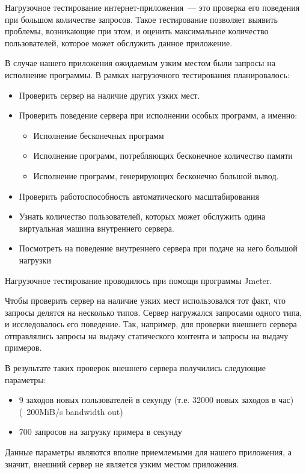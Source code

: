	Нагрузочное тестирование интернет-приложения~--- это проверка его поведения при большом количестве запросов. Такое тестирование позволяет выявить проблемы, возникающие при этом, и оценить максимальное количество пользователей, которое может обслужить данное приложение.
	
	В случае нашего приложения ожидаемым узким местом были запросы на исполнение программы. В рамках нагрузочного тестирования планировалось: 
\begin{itemize}
\item Проверить сервер на наличие других узких мест.
\item Проверить поведение сервера при исполнении особых программ, а именно:
	\begin{itemize}
		\item Исполнение бесконечных программ
		\item Исполнение программ, потребляющих бесконечное количество памяти
		\item Исполнение программ, генерирующих бесконечно большой вывод.
	\end{itemize}
\item Проверить работоспособность автоматического масштабирования
\item Узнать количество пользователей, которых может обслужить одина виртуальная машина внутреннего сервера.
\item Посмотреть на поведение внутреннего сервера при подаче на него большой нагрузки
\end{itemize}

	Нагрузочное тестирование проводилось при помощи программы Jmeter.

	Чтобы проверить сервер на наличие узких мест использовался тот факт, что запросы делятся на несколько типов. Сервер нагружался запросами одного типа, и исследовалось его поведение. Так, например, для проверки внешнего сервера отправлялись запросы на выдачу статического контента и запросы на выдачу примеров.
	
	В результате таких проверок внешнего сервера получились следующие параметры:
\begin{itemize}
	\item 9 заходов новых пользователей в секунду (т.е. 32000 новых заходов в час) (~200MiB/s bandwidth out)
	\item 700 запросов на загрузку примера в секунду
\end{itemize}
	Данные параметры являются вполне приемлемыми для нашего приложения, а значит, внешний сервер не является узким местом приложения. 
	
